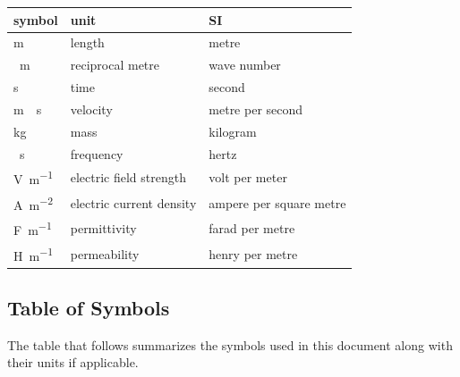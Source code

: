 \documentclass[12pt]{article}
\begin{document}
	\renewcommand{\arraystretch}{1.2} %
	\noindent \begin{tabular}{l l l} \toprule \textbf{symbol} & \textbf{unit} &
		\textbf{SI}\\ \midrule \si{\m} & length & metre\\ \si{\per \meter} &
		reciprocal metre & wave number\\ \si{\second} & time & second\\ \si{\meter
			\per \second} & velocity & metre per second\\ \si{\kilogram} & mass	&
		kilogram\\ \si{\per \second} & frequency& hertz\\ \si{\volt \per \meter} &
		electric field strength & volt per meter\\ \si{\ampere \per \square \meter} &
		electric current density & ampere per square metre\\ \si{\farad \per \meter} &
		permittivity & farad per metre\\ \si{\henry \per \meter} & permeability &
		henry per metre\\ \bottomrule \end{tabular} %
	
	
	\subsection{Table of Symbols}
	
	The table that follows summarizes the symbols used in this document along with
	their units if applicable.
	
\end{document}
